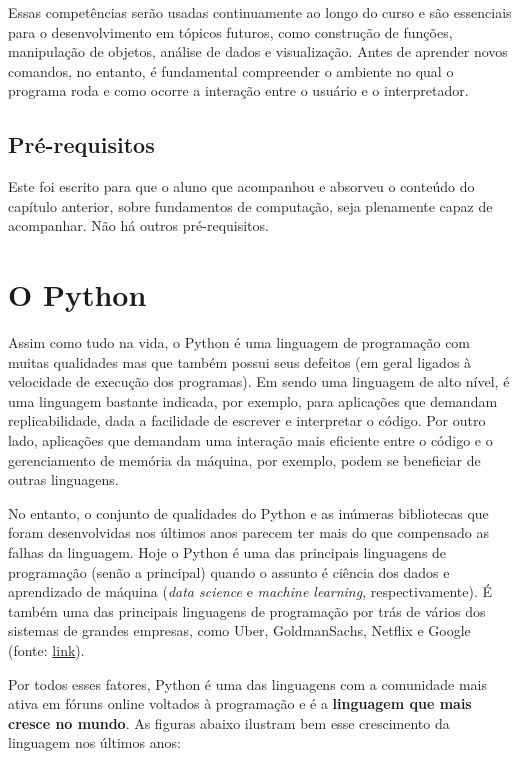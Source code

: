 \documentclass[
  brazilian,
  letterpaper,
  DIV=11,
  numbers=noendperiod]{scrreprt}
\begin{document}
Essas competências serão usadas continuamente ao longo do curso e são
essenciais para o desenvolvimento em tópicos futuros, como construção de
funções, manipulação de objetos, análise de dados e visualização. Antes
de aprender novos comandos, no entanto, é fundamental compreender o
ambiente no qual o programa roda e como ocorre a interação entre o
usuário e o interpretador.

\subsection{Pré-requisitos}\label{pruxe9-requisitos-1}

Este foi escrito para que o aluno que acompanhou e absorveu o conteúdo
do capítulo anterior, sobre fundamentos de computação, seja plenamente
capaz de acompanhar. Não há outros pré-requisitos.

\section{O Python}\label{o-python}

Assim como tudo na vida, o Python é uma linguagem de programação com
muitas qualidades mas que também possui seus defeitos (em geral ligados
à velocidade de execução dos programas). Em sendo uma linguagem de alto
nível, é uma linguagem bastante indicada, por exemplo, para aplicações
que demandam replicabilidade, dada a facilidade de escrever e
interpretar o código. Por outro lado, aplicações que demandam uma
interação mais eficiente entre o código e o gerenciamento de memória da
máquina, por exemplo, podem se beneficiar de outras linguagens.

No entanto, o conjunto de qualidades do Python e as inúmeras bibliotecas
que foram desenvolvidas nos últimos anos parecem ter mais do que
compensado as falhas da linguagem. Hoje o Python é uma das principais
linguagens de programação (senão a principal) quando o assunto é ciência
dos dados e aprendizado de máquina (\emph{data science} e \emph{machine
learning}, respectivamente). É também uma das principais linguagens de
programação por trás de vários dos sistemas de grandes empresas, como
Uber, GoldmanSachs, Netflix e Google (fonte:
\href{https://brainstation.io/career-guides/who-uses-python-today}{link}).

Por todos esses fatores, Python é uma das linguagens com a comunidade
mais ativa em fóruns online voltados à programação e é a
\textbf{linguagem que mais cresce no mundo}. As figuras abaixo ilustram
bem esse crescimento da linguagem nos últimos anos:
\end{document}
